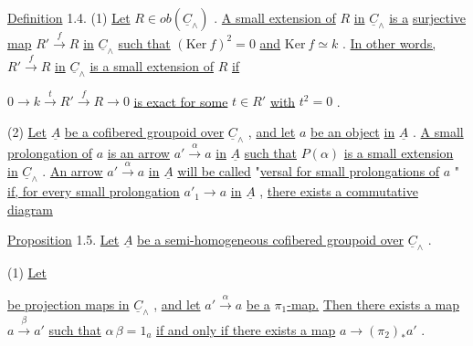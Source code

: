 \underline{Definition} 1.4. (1) \underline{Let}  $R \in ob(\underline{C}_{\wedge})$ . \underline{A small extension of}  $R$  \underline{in}  $\underline{C}_{\wedge}$  \underline{is a}
\underline{surjective map}  $R' \xrightarrow{\ f\ } R$  \underline{in}  $\underline{C}_{\wedge}$  \underline{such that}  $(\mathrm{Ker}\ f)^{2} = 0$  \underline{and}  $\mathrm{Ker}\ f \simeq k$ .
\underline{In other words,}  $R' \xrightarrow{\ f\ } R$  \underline{in}  $\underline{C}_{\wedge}$  \underline{is a small extension of}  $R$  \underline{if}

$0 \longrightarrow k \xrightarrow{\ t\ } R' \xrightarrow{\ f\ } R \longrightarrow 0$
\underline{is exact for some}  $t \in R'$  \underline{with}  $t^{2} = 0$ .

        (2)  \underline{Let}  $\underline{A}$  \underline{be a cofibered groupoid over}  $\underline{C}_{\wedge}$ , \underline{and let}  $a$  \underline{be an object}
\underline{in}  $\underline{A}$ . \underline{A small prolongation of}  $a$  \underline{is an arrow}  $a' \xrightarrow{\ \alpha\ } a$  \underline{in}  $\underline{A}$  \underline{such that}
$P(\alpha)$  \underline{is a small extension in}  $\underline{C}_{\wedge}$ . \underline{An arrow}  $a' \xrightarrow{\ \alpha\ } a$  \underline{in}  $\underline{A}$  \underline{will be called}
"\underline{versal for small prolongations of}  $a$  "  \underline{if, for every small prolongation}
$a'_{1} \longrightarrow a$  \underline{in}  $\underline{A}$ , \underline{there exists a commutative diagram}

\begin{center}
\end{center}
\underline{Proposition} 1.5.    \underline{Let}  $\underline{A}$  \underline{be a semi-homogeneous cofibered groupoid over}  $\underline{C}_{\wedge}$ .

(1) \underline{Let}    \underline{be projection maps in}  $\underline{C}_{\wedge}$ , \underline{and let}  $a' \xrightarrow{\ \alpha\ } a$
\underline{be a}  \underline{$\pi_1$-map.} \underline{Then there exists a map}  $a \xrightarrow{\ \beta\ } a'$  \underline{such that}  $\alpha\,\beta = 1_a$ \underline{if and only if there exists a map}  $a \longrightarrow (\pi_2)_* a'$  .

